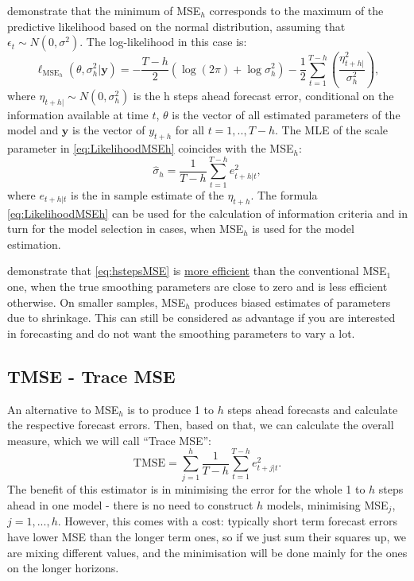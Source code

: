 \documentclass[
]{book}
\theoremstyle{definition}
\theoremstyle{definition}
\theoremstyle{definition}
\theoremstyle{definition}
\theoremstyle{remark}
\begin{document}
\citet{Svetunkov2020Multistep} demonstrate that the minimum of MSE\(_h\) corresponds to the maximum of the predictive likelihood based on the normal distribution, assuming that \(\epsilon_t \sim N(0,\sigma^2)\). The log-likelihood in this case is:
\begin{equation}
    \ell_{\mathrm{MSE}_h}(\theta, {\sigma^2_h} | \mathbf{y}) = -\frac{T-h}{2} \left( \log(2 \pi) + \log \sigma^2_h \right) -\frac{1}{2} \sum_{t=1}^{T-h} \left( \frac{\eta_{t+h|}^2}{\sigma^2_h} \right) ,
  \label{eq:LikelihoodMSEh}
\end{equation}
where \(\eta_{t+h|} \sim N(0, \sigma_h^2)\) is the h steps ahead forecast error, conditional on the information available at time \(t\), \(\theta\) is the vector of all estimated parameters of the model and \(\mathbf{y}\) is the vector of \(y_{t+h}\) for all \(t=1,..,T-h\). The MLE of the scale parameter in \eqref{eq:LikelihoodMSEh} coincides with the MSE\(_h\):
\begin{equation}
    \hat{\sigma}_h = \frac{1}{T-h} \sum_{t=1}^{T-h} e_{t+h|t}^2 ,
  \label{eq:hstepsSigma}
\end{equation}
where \(e_{t+h|t}\) is the in sample estimate of the \(\eta_{t+h}\). The formula \eqref{eq:LikelihoodMSEh} can be used for the calculation of information criteria and in turn for the model selection in cases, when MSE\(_h\) is used for the model estimation.

\citet{Svetunkov2020Multistep} demonstrate that \eqref{eq:hstepsMSE} is \protect\hyperlink{estimatesProperties}{more efficient} than the conventional MSE\(_1\) one, when the true smoothing parameters are close to zero and is less efficient otherwise. On smaller samples, MSE\(_h\) produces biased estimates of parameters due to shrinkage. This can still be considered as advantage if you are interested in forecasting and do not want the smoothing parameters to vary a lot.

\hypertarget{multistepLossesTMSE}{%
\subsection{TMSE - Trace MSE}\label{multistepLossesTMSE}}

An alternative to MSE\(_h\) is to produce 1 to \(h\) steps ahead forecasts and calculate the respective forecast errors. Then, based on that, we can calculate the overall measure, which we will call ``Trace MSE'':
\begin{equation}
    \mathrm{TMSE} = \sum_{j=1}^h \frac{1}{T-h} \sum_{t=1}^{T-h} e_{t+j|t}^2 .
  \label{eq:TMSE}
\end{equation}
The benefit of this estimator is in minimising the error for the whole 1 to \(h\) steps ahead in one model - there is no need to construct \(h\) models, minimising MSE\(_j\), \(j=1,...,h\). However, this comes with a cost: typically short term forecast errors have lower MSE than the longer term ones, so if we just sum their squares up, we are mixing different values, and the minimisation will be done mainly for the ones on the longer horizons.
\end{document}
